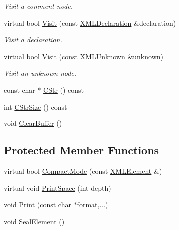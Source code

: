 \begin{DoxyCompactItemize}
\begin{DoxyCompactList}\small\item\em Visit a comment node. \end{DoxyCompactList}\item 
virtual bool \hyperlink{classtinyxml2_1_1_x_m_l_printer_acfc625b2549304b9c7eb85ebd5c5eb39}{Visit} (const \hyperlink{classtinyxml2_1_1_x_m_l_declaration}{X\+M\+L\+Declaration} \&declaration)
\begin{DoxyCompactList}\small\item\em Visit a declaration. \end{DoxyCompactList}\item 
virtual bool \hyperlink{classtinyxml2_1_1_x_m_l_printer_ab8af5455bbf9e4be2663e6642fcd7e32}{Visit} (const \hyperlink{classtinyxml2_1_1_x_m_l_unknown}{X\+M\+L\+Unknown} \&unknown)
\begin{DoxyCompactList}\small\item\em Visit an unknown node. \end{DoxyCompactList}\item 
const char $\ast$ \hyperlink{classtinyxml2_1_1_x_m_l_printer_a4a1b788e11b540921ec50687cd2b24a9}{C\+Str} () const 
\item 
int \hyperlink{classtinyxml2_1_1_x_m_l_printer_a02c3c5f8c6c007dcbaf10595d9e22bf0}{C\+Str\+Size} () const 
\item 
void \hyperlink{classtinyxml2_1_1_x_m_l_printer_a216157765b7267bf389975b1cbf9a909}{Clear\+Buffer} ()
\end{DoxyCompactItemize}
\subsection*{Protected Member Functions}
\begin{DoxyCompactItemize}
\item 
virtual bool \hyperlink{classtinyxml2_1_1_x_m_l_printer_a38e1ed5a779bdf63eda9e808f7a6de66}{Compact\+Mode} (const \hyperlink{classtinyxml2_1_1_x_m_l_element}{X\+M\+L\+Element} \&)
\item 
virtual void \hyperlink{classtinyxml2_1_1_x_m_l_printer_a1c4b2ccbe4fdb316d54f5a93f3559260}{Print\+Space} (int depth)
\item 
void \hyperlink{classtinyxml2_1_1_x_m_l_printer_ab30210a7f32e45634e7a45137bf6fdf6}{Print} (const char $\ast$format,...)
\item 
void \hyperlink{classtinyxml2_1_1_x_m_l_printer_a70ac2010150c8551773ffb2f96fef353}{Seal\+Element} ()
\end{DoxyCompactItemize}
